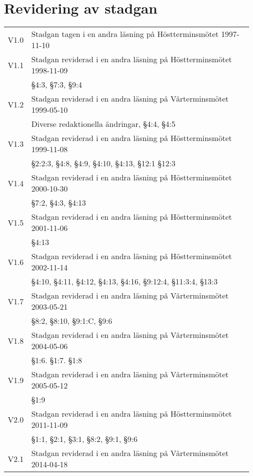 \documentclass[10pt]{article}
\begin{document}
    \newpage
    \section*{Revidering av stadgan}
    
    \renewcommand*\arraystretch{1}
    \begin{tabular}{p{7mm} p{110mm}}
        V1.0 & Stadgan tagen i en andra läsning på Höstterminsmötet 1997-11-10\\
        V1.1 & Stadgan reviderad i en andra läsning på Höstterminsmötet 1998-11-09\\
        & §4:3, §7:3, §9:4\\
        V1.2 & Stadgan reviderad i en andra läsning på Vårterminsmötet 1999-05-10\\
        & Diverse redaktionella ändringar, §4:4, §4:5 \\
        V1.3 & Stadgan reviderad i en andra läsning på Höstterminsmötet 1999-11-08\\
        & §2:2:3, §4:8, §4:9, §4:10, §4:13, §12:1 §12:3\\
        V1.4 & Stadgan reviderad i en andra läsning på Höstterminsmötet 2000-10-30\\
        & §7:2, §4:3, §4:13\\
        V1.5 & Stadgan reviderad i en andra läsning på Höstterminsmötet 2001-11-06\\
        & §4:13\\
        V1.6 & Stadgan reviderad i en andra läsning på Höstterminsmötet 2002-11-14\\
        & §4:10, §4:11, §4:12, §4:13, §4:16, §9:12:4, §11:3:4, §13:3\\
        V1.7 & Stadgan reviderad i en andra läsning på Vårterminsmötet 2003-05-21\\
        & §8:2, §8:10, §9:1:C, §9:6 \\
        V1.8 & Stadgan reviderad i en andra läsning på Vårterminsmötet 2004-05-06\\
        & §1:6. §1:7. §1:8	\\
        V1.9 & Stadgan reviderad i en andra läsning på Vårterminsmötet 2005-05-12\\
        & §1:9\\
        V2.0 & Stadgan reviderad i en andra läsning på Höstterminsmötet 2011-11-09\\
        & §1:1, §2:1, §3:1, §8:2, §9:1, §9:6\\
         V2.1 & Stadgan reviderad i en andra läsning på Vårterminsmötet 2014-04-18\\

\end{tabular}
\end{document}
